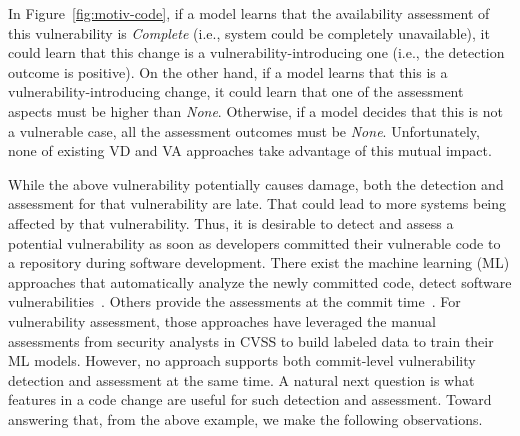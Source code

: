 \vspace{2pt}
 In Figure~\ref{fig:motiv-code}, if a model learns
that the availability assessment of this vulnerability is {\em
  Complete} (i.e., system could be completely unavailable), it could
learn that this change is a vulnerability-introducing one (i.e., the
detection outcome is positive). On the other hand, if a model learns
that this is a vulnerability-introducing change, it could learn that
one of the assessment aspects must be higher than {\em
  None}. Otherwise, if a model decides that this is not a vulnerable
case, all the assessment outcomes must be {\em None}. Unfortunately,
none of existing VD and VA approaches take advantage of this mutual
impact.




While the above vulnerability potentially causes damage, both the
detection and assessment for that vulnerability are late. That could
lead to more systems being affected by that vulnerability. Thus, it is
desirable to detect and assess a potential vulnerability as soon as
developers committed their vulnerable code to a repository during
software development. There exist the machine learning (ML) approaches
that automatically analyze the newly committed code, detect software
vulnerabilities~\cite{perl2015vccfinder,zhou2017automated,chen2019large}.
Others provide the assessments at the commit time~\cite{deepCVA-ase21}. For
vulnerability assessment, those approaches have leveraged the manual
assessments from security analysts in CVSS to build labeled data to
train their ML models. However, no approach supports both commit-level
vulnerability detection and assessment at the same time.
A natural next question is what features in a code change are useful
for such detection and assessment. Toward answering that, from the
above example, we make the following observations.


